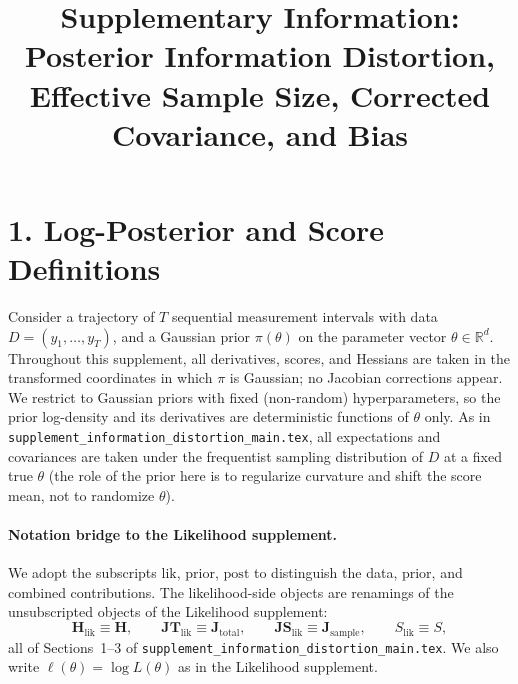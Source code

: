 \documentclass[11pt]{article}
\title{Supplementary Information: Posterior Information Distortion, Effective Sample Size, Corrected Covariance, and Bias}
\author{}
\date{}
\begin{document}
\maketitle


\section*{1. Log-Posterior and Score Definitions}

Consider a trajectory of $T$ sequential measurement intervals with data $D = (y_1,\ldots,y_T)$, and a Gaussian prior $\pi(\theta)$ on the parameter vector $\theta \in \mathbb{R}^d$. Throughout this supplement, all derivatives, scores, and Hessians are taken in the transformed coordinates in which $\pi$ is Gaussian; no Jacobian corrections appear. We restrict to Gaussian priors with fixed (non-random) hyperparameters, so the prior log-density and its derivatives are deterministic functions of $\theta$ only. As in \texttt{supplement\_information\_distortion\_main.tex}, all expectations and covariances are taken under the frequentist sampling distribution of $D$ at a fixed true $\theta$ (the role of the prior here is to regularize curvature and shift the score mean, not to randomize $\theta$).

\paragraph{Notation bridge to the Likelihood supplement.}
We adopt the subscripts $\mathrm{lik}$, $\mathrm{prior}$, $\mathrm{post}$ to distinguish the data, prior, and combined contributions. The likelihood-side objects are renamings of the unsubscripted objects of the Likelihood supplement:
\begin{equation}
\mathbf H_{\mathrm{lik}} \equiv \mathbf H,
\qquad
\mathbf{JT}_{\mathrm{lik}} \equiv \mathbf J_{\mathrm{total}},
\qquad
\mathbf{JS}_{\mathrm{lik}} \equiv \mathbf J_{\mathrm{sample}},
\qquad
S_{\mathrm{lik}} \equiv S,
\label{eq:notation-bridge}
\end{equation}
all of Sections~1--3 of \texttt{supplement\_information\_distortion\_main.tex}. We also write $\ell(\theta) = \log L(\theta)$ as in the Likelihood supplement.
\end{document}
